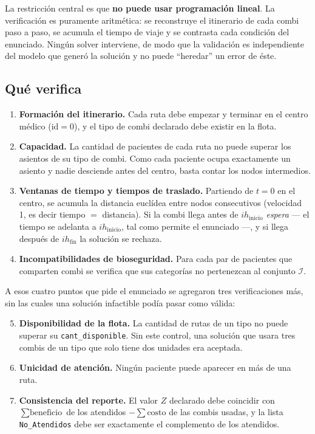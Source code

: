 \documentclass[12pt]{article}
\numberwithin{algorithm}{section}
\begin{document}
La restricción central es que \textbf{no puede usar programación lineal}. La verificación es
puramente aritmética: se reconstruye el itinerario de cada combi paso a paso, se acumula el
tiempo de viaje y se contrasta cada condición del enunciado. Ningún solver interviene, de modo
que la validación es independiente del modelo que generó la solución y no puede ``heredar''
un error de éste.

\subsection*{Qué verifica}

\begin{enumerate}
    \item \textbf{Formación del itinerario.} Cada ruta debe empezar y terminar en el centro
    médico ($\text{id} = 0$), y el tipo de combi declarado debe existir en la flota.
    \item \textbf{Capacidad.} La cantidad de pacientes de cada ruta no puede superar los
    asientos de su tipo de combi. Como cada paciente ocupa exactamente un asiento y nadie
    desciende antes del centro, basta contar los nodos intermedios.
    \item \textbf{Ventanas de tiempo y tiempos de traslado.} Partiendo de $t = 0$ en el centro,
    se acumula la distancia euclídea entre nodos consecutivos (velocidad 1, es decir tiempo
    $=$ distancia). Si la combi llega antes de $ih_{\text{inicio}}$ \emph{espera} --- el
    tiempo se adelanta a $ih_{\text{inicio}}$, tal como permite el enunciado ---, y si llega
    después de $ih_{\text{fin}}$ la solución se rechaza.
    \item \textbf{Incompatibilidades de bioseguridad.} Para cada par de pacientes que comparten
    combi se verifica que sus categorías no pertenezcan al conjunto $\mathcal{I}$.
\end{enumerate}

A esos cuatro puntos que pide el enunciado se agregaron tres verificaciones más, sin las
cuales una solución infactible podía pasar como válida:

\begin{enumerate}\setcounter{enumi}{4}
    \item \textbf{Disponibilidad de la flota.} La cantidad de rutas de un tipo no puede superar
    su \texttt{cant\_disponible}. Sin este control, una solución que usara tres combis de un
    tipo que solo tiene dos unidades era aceptada.
    \item \textbf{Unicidad de atención.} Ningún paciente puede aparecer en más de una ruta.
    \item \textbf{Consistencia del reporte.} El valor $Z$ declarado debe coincidir con
    $\sum \text{beneficio}$ de los atendidos $- \sum \text{costo}$ de las combis usadas, y la
    lista \texttt{No\_Atendidos} debe ser exactamente el complemento de los atendidos.
\end{enumerate}
\end{document}
